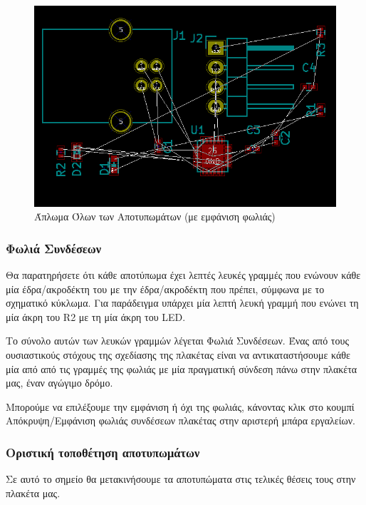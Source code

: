 \documentclass[a4paper]{article}
\begin{document}
\begin{figure}
  \begin{center}
    \includegraphics[width=.9\textwidth]{img/pcb-circ-allspreadrat.png}
    \caption{Άπλωμα Όλων των Αποτυπωμάτων (με εμφάνιση φωλιάς)}
    \label{fig:pcb-circ-allspreadrat}
  \end{center}
\end{figure}

\subsubsection{Φωλιά Συνδέσεων}
Θα παρατηρήσετε ότι κάθε αποτύπωμα έχει λεπτές λευκές γραμμές που ενώνουν κάθε μία έδρα/ακροδέκτη του με την έδρα/ακροδέκτη που πρέπει, σύμφωνα με το σχηματικό κύκλωμα. Για παράδειγμα υπάρχει μία λεπτή λευκή γραμμή που ενώνει τη μία άκρη του R2 με τη μία άκρη του LED. 

Το σύνολο αυτών των λευκών γραμμών λέγεται Φωλιά Συνδέσεων. Ένας από τους ουσιαστικούς στόχους της σχεδίασης της πλακέτας είναι να αντικαταστήσουμε κάθε μία από από τις γραμμές της φωλιάς με μία πραγματική σύνδεση πάνω στην πλακέτα μας, έναν αγώγιμο δρόμο. 

Μπορούμε να επιλέξουμε την εμφάνιση ή όχι της φωλιάς, κάνοντας κλικ στο κουμπί Απόκρυψη/Εμφάνιση φωλιάς συνδέσεων πλακέτας στην αριστερή μπάρα εργαλείων.


\subsubsection{Οριστική τοποθέτηση αποτυπωμάτων}

Σε αυτό το σημείο θα μετακινήσουμε τα αποτυπώματα στις τελικές θέσεις τους στην πλακέτα μας. 
\end{document}
